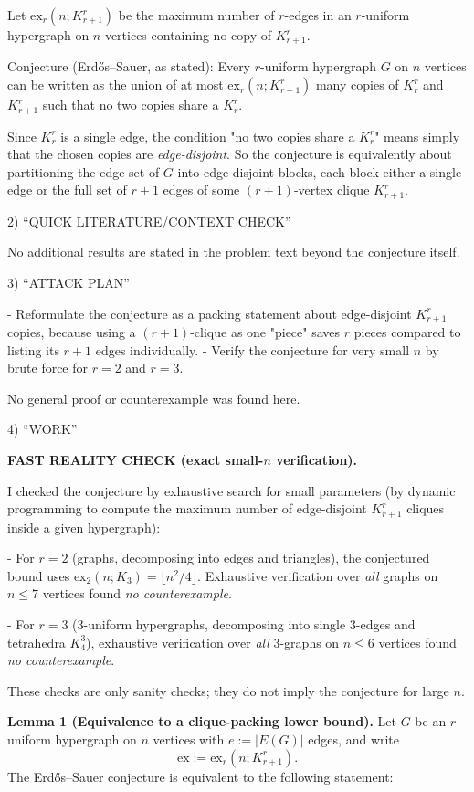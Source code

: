 Let $\mathrm{ex}_r(n;K_{r+1}^r)$ be the maximum number of $r$-edges in an $r$-uniform hypergraph on $n$ vertices containing no copy of $K_{r+1}^r$.

Conjecture (Erd\H{o}s--Sauer, as stated): Every $r$-uniform hypergraph $G$ on $n$ vertices can be written as the union of at most $\mathrm{ex}_r(n;K_{r+1}^r)$ many copies of $K_r^r$ and $K_{r+1}^r$ such that no two copies share a $K_r^r$.

Since $K_r^r$ is a single edge, the condition "no two copies share a $K_r^r$" means simply that the chosen copies are \emph{edge-disjoint}.
So the conjecture is equivalently about partitioning the edge set of $G$ into edge-disjoint blocks, each block either a single edge or the full set of $r+1$ edges of some $(r+1)$-vertex clique $K_{r+1}^r$.

2) “QUICK LITERATURE/CONTEXT CHECK”

No additional results are stated in the problem text beyond the conjecture itself.

3) “ATTACK PLAN”

- Reformulate the conjecture as a packing statement about edge-disjoint $K_{r+1}^r$ copies, because using a $(r+1)$-clique as one "piece" saves $r$ pieces compared to listing its $r+1$ edges individually.
- Verify the conjecture for very small $n$ by brute force for $r=2$ and $r=3$.

No general proof or counterexample was found here.

4) “WORK”

\textbf{FAST REALITY CHECK (exact small-$n$ verification).}

I checked the conjecture by exhaustive search for small parameters (by dynamic programming to compute the maximum number of edge-disjoint $K_{r+1}^r$ cliques inside a given hypergraph):

- For $r=2$ (graphs, decomposing into edges and triangles), the conjectured bound uses $\mathrm{ex}_2(n;K_3)=\lfloor n^2/4\rfloor$.
Exhaustive verification over \emph{all} graphs on $n\le 7$ vertices found \emph{no counterexample}.

- For $r=3$ (3-uniform hypergraphs, decomposing into single 3-edges and tetrahedra $K_4^3$), exhaustive verification over \emph{all} 3-graphs on $n\le 6$ vertices found \emph{no counterexample}.

These checks are only sanity checks; they do not imply the conjecture for large $n$.

\medskip
\textbf{Lemma 1 (Equivalence to a clique-packing lower bound).}
Let $G$ be an $r$-uniform hypergraph on $n$ vertices with $e:=|E(G)|$ edges, and write
\[
\mathrm{ex}:=\mathrm{ex}_r(n;K_{r+1}^r).
\]
The Erd\H{o}s--Sauer conjecture is equivalent to the following statement:

